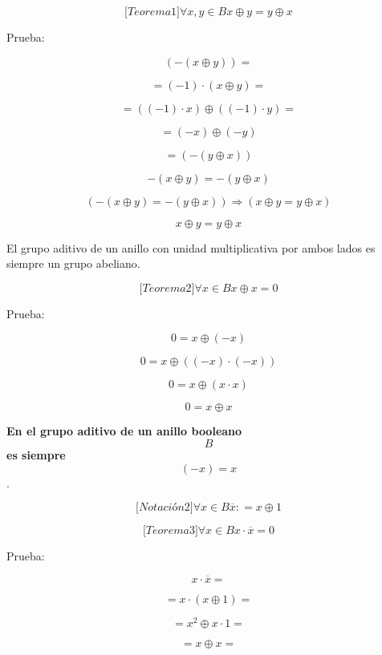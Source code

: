 \begin{enumerate}
\begin{enumerate}
\begin{enumerate}
      \[{\lbrack{{Teorema}1}\rbrack}\forall x,{y \in B}x \oplus {y = y} \oplus x\]

      Prueba:

      \[\left( {- \left( {x \oplus y} \right)} \right) =\]

      \[{= {\left( {- 1} \right) \cdot \left( {x \oplus y} \right)}} =\]

      \[{= \left( {\left( {- 1} \right) \cdot x} \right)} \oplus {\left( {\left( {- 1} \right) \cdot y} \right) =}\]

      \[{= \left( {- x} \right)} \oplus \left( {- y} \right)\]

      \[= \left( {- \left( {y \oplus x} \right)} \right)\]

      \[{- \left( {x \oplus y} \right)} = {- \left( {y \oplus x} \right)}\]

      \[\left( {{- \left( {x \oplus y} \right)} = {- \left( {y \oplus x} \right)}} \right)\Rightarrow\left( {x \oplus {y = y} \oplus x} \right)\]

      \[x \oplus {y = y} \oplus x\]

      El grupo aditivo de un anillo con unidad multiplicativa por ambos
      lados es siempre un grupo abeliano.

      \[{\lbrack{{Teorema}2}\rbrack}\forall{x \in B}x \oplus {x = 0}\]

      Prueba:

      \[{0 = x} \oplus \left( {- x} \right)\]

      \[{0 = x} \oplus \left( {\left( {- x} \right) \cdot \left( {- x} \right)} \right)\]

      \[{0 = x} \oplus \left( {x \cdot x} \right)\]

      \[{0 = x} \oplus x\]

      \textbf{En el grupo aditivo de un anillo booleano
      }\emph{\[B\]}\textbf{ es siempre
      }\emph{\[\left( {- x} \right) = x\]}.

      \[{\lbrack{{Notación}2}\rbrack}\forall{x \in B}\overline{x}{: = x} \oplus 1\]

      \[{\lbrack{{Teorema}3}\rbrack}\forall{x \in B}{{x \cdot \overline{x}} = 0}\]

      Prueba:

      \[{x \cdot \overline{x}} =\]

      \[{= {x \cdot \left( {x \oplus 1} \right)}} =\]

      \[{= {x^{2} \oplus {x \cdot 1}}} =\]

      \[{= {x \oplus x}} =\]


\end{enumerate}
\end{enumerate}
\end{enumerate}
